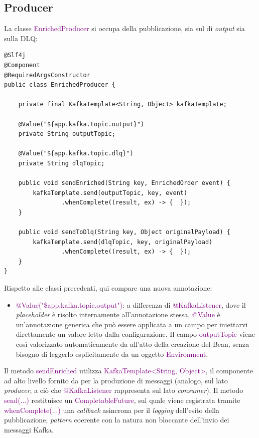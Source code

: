 \newpage
\subsection{Producer}
La classe \textcolor{purple}{EnrichedProducer} si occupa della pubblicazione, sia sul \textit{} di \textit{output} sia sulla \acrshort{DLQ}:
\begin{codelisting}[H]
\begin{verbatim}
@Slf4j
@Component
@RequiredArgsConstructor
public class EnrichedProducer {

    private final KafkaTemplate<String, Object> kafkaTemplate;

    @Value("${app.kafka.topic.output}")
    private String outputTopic;

    @Value("${app.kafka.topic.dlq}")
    private String dlqTopic;

    public void sendEnriched(String key, EnrichedOrder event) {
        kafkaTemplate.send(outputTopic, key, event)
                .whenComplete((result, ex) -> {  });
    }

    public void sendToDlq(String key, Object originalPayload) {
        kafkaTemplate.send(dlqTopic, key, originalPayload)
                .whenComplete((result, ex) -> {  });
    }
}
\end{verbatim}
\caption{EnrichedProducer}
\end{codelisting}
\noindent
Rispetto alle classi precedenti, qui compare una nuova annotazione:
\begin{itemize}
    \item \textcolor{purple}{@Value("\${app.kafka.topic.output}")}: a differenza di \textcolor{purple}{@KafkaListener}, dove il \textit{placeholder} è risolto internamente all'annotazione stessa, \textcolor{purple}{@Value} è un'annotazione generica che può essere applicata a un campo per iniettarvi direttamente un valore letto dalla configurazione. Il campo \textcolor{purple}{outputTopic} viene così valorizzato automaticamente da  all'atto della creazione del \gls{Bean}, senza bisogno di leggerlo esplicitamente da un oggetto \textcolor{purple}{Environment}.
\end{itemize}
Il metodo \textcolor{purple}{sendEnriched} utilizza \textcolor{purple}{KafkaTemplate<String, Object>}, il componente ad alto livello fornito da  per la produzione di messaggi (analogo, sul lato \textit{producer}, a ciò che \textcolor{purple}{@KafkaListener} rappresenta sul lato \textit{consumer}).
\newpage
\noindent
Il metodo \textcolor{purple}{send(...)} restituisce un \textcolor{purple}{CompletableFuture}, sul quale viene registrata tramite \textcolor{purple}{whenComplete(...)} una \textit{callback} asincrona per il \textit{logging} dell'esito della pubblicazione, \textit{pattern} coerente con la natura non bloccante dell'invio dei messaggi Kafka.

